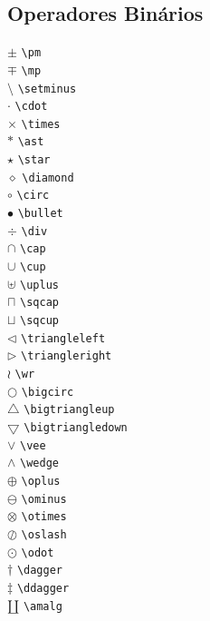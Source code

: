 \documentclass[xindy,rascunho]{fei}
\begin{document}
\begin{teorema}
\section{Operadores Binários}
\begin{multicols}{3}
\noindent
\(\pm\) \verb+\pm+\\
\(\mp\) \verb+\mp+\\
\(\setminus\) \verb+\setminus+\\
\(\cdot\) \verb+\cdot+\\
\(\times\) \verb+\times+\\
\(\ast\) \verb+\ast+\\
\(\star\) \verb+\star+\\
\(\diamond\) \verb+\diamond+\\
\(\circ\) \verb+\circ+\\
\(\bullet\) \verb+\bullet+\\
\(\div\) \verb+\div+\\
\(\cap\) \verb+\cap+\\
\(\cup\) \verb+\cup+\\
\(\uplus\) \verb+\uplus+\\
\(\sqcap\) \verb+\sqcap+\\
\(\sqcup\) \verb+\sqcup+\\
\(\triangleleft\) \verb+\triangleleft+\\
\(\triangleright\) \verb+\triangleright+\\
\(\wr\) \verb+\wr+\\
\(\bigcirc\) \verb+\bigcirc+\\
\(\bigtriangleup\) \verb+\bigtriangleup+\\
\(\bigtriangledown\) \verb+\bigtriangledown+\\
\(\vee\) \verb+\vee+\\
\(\wedge\) \verb+\wedge+\\
\(\oplus\) \verb+\oplus+\\
\(\ominus\) \verb+\ominus+\\
\(\otimes\) \verb+\otimes+\\
\(\oslash\) \verb+\oslash+\\
\(\odot\) \verb+\odot+\\
\(\dagger\) \verb+\dagger+\\
\(\ddagger\) \verb+\ddagger+\\
\(\amalg\) \verb+\amalg+\\
\end{multicols}


\end{teorema}
\end{document}

